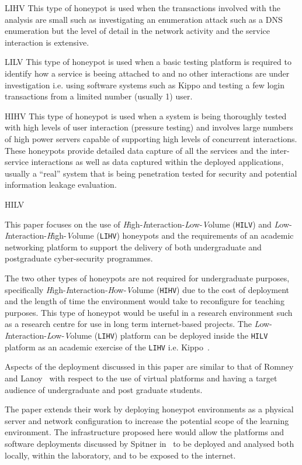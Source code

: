 LIHV This type of honeypot is used when the transactions involved with the analysis are small such as investigating an enumeration attack such as a DNS enumeration but the level of detail in the network activity and the service interaction is extensive.

LILV This type of honeypot is used when a basic testing platform is required to identify how a service is beeing attached to and no other interactions are under investigation i.e. using software systems such as Kippo and testing a few login transactions from a limited number (usually 1) user.

HIHV This type of honeypot is used when a system is being thoroughly tested with high levels of user interaction (pressure testing) and involves large numbers of high power servers capable of supporting high levels of concurrent interactions. These honeypots provide detailed data capture of all the services and the inter-service interactions as well as data captured within the deployed applications, usually a ``real'' system that is being penetration tested for security and potential information leakage evaluation.  

HILV

This paper focuses on the use of \emph{H}igh-\emph{I}nteraction-\emph{L}ow-\emph{V}olume (\texttt{HILV}) and \emph{L}ow-\emph{I}nteraction-\emph{H}igh-\emph{V}olume (\texttt{LIHV}) honeypots and the requirements of an academic networking platform to support the delivery of both undergraduate and postgraduate cyber-security programmes. 

The two other types of honeypots are not required for undergraduate purposes, specifically \emph{H}igh-\emph{I}nteraction-\emph{H}ow-\emph{V}olume (\texttt{HIHV}) due to the cost of deployment and the length of time the environment would take to reconfigure for teaching purposes. This type of honeypot would be useful in a research environment such as a research centre for use in long term internet-based projects. The \emph{L}ow-\emph{I}nteraction-\emph{L}ow-\emph{V}olume (\texttt{LIHV}) platform can be deployed inside the \texttt{HILV} platform as an academic exercise of the \texttt{LIHV} i.e. Kippo~\cite{D:16,SH:15}.

Aspects of the deployment discussed in this paper are similar to that of Romney and Lanoy~\cite{LR:06} with respect to the use of virtual platforms and having a target audience of undergraduate and post graduate students. 

The paper extends their work by deploying honeypot environments as a physical server and network configuration to increase the potential scope of the learning environment. The infrastructure proposed here would allow the platforms and software deployments discussed by Spitner in~\cite{LS:03} to be deployed and analysed both locally, within the laboratory, and to be exposed to the internet. 

